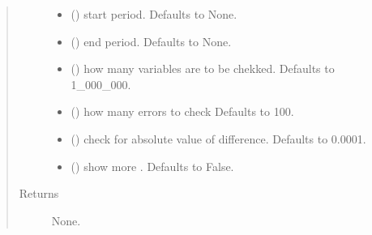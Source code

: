 \documentclass[letterpaper,10pt,english]{sphinxmanual}
\begin{document}
\begin{fulllineitems}
\begin{fulllineitems}
\begin{quote}
\begin{description}
\begin{itemize}
\item {} 
\sphinxAtStartPar
{} (\sphinxstyleliteralemphasis{\sphinxupquote{, }}) \textendash{} start period. Defaults to None.

\item {} 
\sphinxAtStartPar
{} (\sphinxstyleliteralemphasis{\sphinxupquote{, }}) \textendash{} end period. Defaults to None.

\item {} 
\sphinxAtStartPar
{} (\sphinxstyleliteralemphasis{\sphinxupquote{, }}) \textendash{} how many variables are to be chekked. Defaults to 1\_000\_000.

\item {} 
\sphinxAtStartPar
{} (\sphinxstyleliteralemphasis{\sphinxupquote{, }}) \textendash{} how many errors to check Defaults to 100.

\item {} 
\sphinxAtStartPar
{} (\sphinxstyleliteralemphasis{\sphinxupquote{, }}) \textendash{} check for absolute value of difference. Defaults to 0.0001.

\item {} 
\sphinxAtStartPar
{} (\sphinxstyleliteralemphasis{\sphinxupquote{, }}) \textendash{} show more . Defaults to False.

\end{itemize}

\item[{Returns}] \leavevmode
\sphinxAtStartPar
None.

\end{description}\end{quote}

\end{fulllineitems}


\end{fulllineitems}
\end{document}
